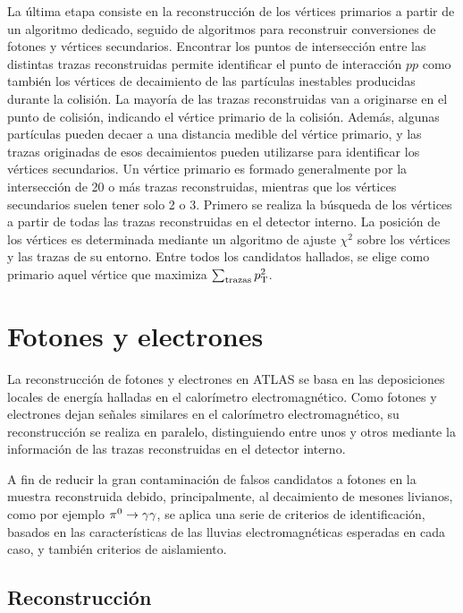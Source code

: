 La última etapa consiste en la reconstrucción de los vértices primarios
a partir de un algoritmo dedicado, seguido de algoritmos para reconstruir
conversiones de fotones y vértices secundarios.
Encontrar los puntos de intersección entre las distintas trazas reconstruidas
permite identificar el punto de interacción $pp$ como también los vértices de
decaimiento de las partículas inestables producidas durante la colisión. La
mayoría de las trazas reconstruidas van a originarse en el punto de colisión,
indicando el vértice primario de la colisión. Además, algunas partículas pueden
decaer a una distancia medible del vértice primario, y las trazas originadas de
esos decaimientos pueden utilizarse para identificar los vértices secundarios.
Un vértice primario es formado generalmente por la intersección de 20 o más
trazas reconstruidas, mientras que los vértices secundarios suelen tener solo 2
o 3. Primero se realiza la búsqueda de los vértices a partir de todas las trazas
reconstruidas en el detector interno. La posición de los vértices es determinada
mediante un algoritmo de ajuste $\chi^2$ sobre los vértices y las trazas de su
entorno. Entre todos los candidatos hallados, se elige como primario aquel
vértice que maximiza $\sum_{\text{trazas}} p_{\mathrm{T}}^2$.



\section{Fotones y electrones}
\label{sec:obj_photons}

La reconstrucción de fotones y electrones en ATLAS se basa en las deposiciones
locales de energía halladas en el calorímetro electromagnético. Como fotones y
electrones dejan señales similares en el calorímetro electromagnético, su
reconstrucción se realiza en paralelo, distinguiendo entre unos y otros
mediante la información de las trazas reconstruidas en el detector
interno.

A fin de reducir la gran contaminación de falsos candidatos a fotones en la
muestra reconstruida debido, principalmente, al decaimiento de mesones livianos,
como por ejemplo $\pi^0 \to \gam\gam$, se aplica una serie de criterios de
identificación, basados en las características de las lluvias electromagnéticas
esperadas en cada caso, y también criterios de aislamiento.


\subsection{Reconstrucción}

